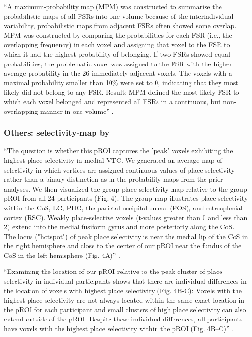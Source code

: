 %
``A maximum-probability map (MPM) was constructed to summarize the probabilistic
maps of all FSRs into one volume because of the interindividual variability,
probabilistic maps from adjacent FSRs often showed some overlap.
%
MPM was constructed by comparing the probabilities for each FSR (i.e., the
overlapping frequency) in each voxel and assigning that voxel to the FSR to
which it had the highest probability of belonging.
%
If two FSRs showed equal probabilities, the problematic voxel was assigned to
the FSR with the higher average probability in the 26 immediately adjacent
voxels.
%
The voxels with a maximal probability smaller than 10\% were set to 0,
indicating that they most likely did not belong to any FSR.
%
Result: MPM defined the most likely FSR to which each voxel belonged and
represented all FSRs in a continuous, but non-overlapping manner in one
volume'' \citep{zhen2015quantifying}.


\subsubsection{Others: selectivity-map by \citet{weiner2018defining}}
%
``The question is whether this pROI captures the 'peak' voxels exhibiting the
highest place selectivity in medial VTC.
%
We generated an average map of selectivity in which vertices are assigned
continuous values of place selectivity rather than a binary distinction as in
the probability maps from the prior analyses.
%
We then visualized the group place selectivity map relative to the group pROI
from all 24 participants (Fig. 4).
%
The group map illustrates place selectivity within the CoS, LG, PHG, the
parietal occipital sulcus (POS), and retrosplenial cortex (RSC).
%
Weakly place-selective voxels (t-values greater than 0 and less than 2) extend
into the medial fusiform gyrus and more posteriorly along the CoS.
%
The locus ("hotspot") of peak place selectivity is near the medial lip of the
CoS in the right hemisphere and close to the center of our pROI near the fundus
of the CoS in the left hemisphere (Fig. 4A)'' \citep{weiner2018defining}.

``Examining the location of our pROI relative to the peak cluster of place
selectivity in individual participants shows that there are individual
differences in the location of voxels with highest place selectivity (Fig.
4B-C):
%
Voxels with the highest place selectivity are not always located within the same
exact location in the pROI for each participant and small clusters of high place
selectivity can also extend outside of the pROI.
%
Despite these individual differences, all participants have voxels with the
highest place selectivity within the pROI (Fig. 4B–C)''
\citep{weiner2018defining}.

